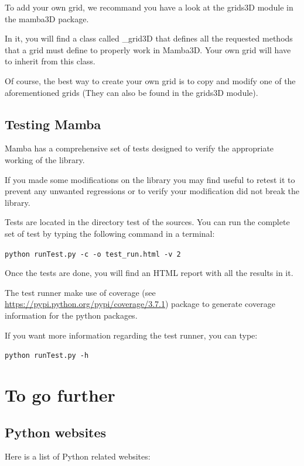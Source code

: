 \documentclass[a4paper,10pt,oneside]{article}
\begin{document}
To add your own grid, we recommand you have a look at the grids3D module in
the mamba3D package.

In it, you will find a class called \_grid3D that defines all the requested
methods that a grid must define to properly work in Mamba3D. Your own grid
will have to inherit from this class.

Of course, the best way to create your own grid is to copy and modify one
of the aforementioned grids (They can also be found in the grids3D module).

\subsection{Testing Mamba}
\label{cha:testing_mamba}

Mamba has a comprehensive set of tests designed to verify the appropriate
working of the library.

If you made some modifications on the library you may find useful to retest it
to prevent any unwanted regressions or to verify your modification did not break
the library.

Tests are located in the directory test of the sources. You can run the complete
set of test by typing the following command in a terminal:

\texttt{python runTest.py -c -o test\_run.html -v 2}

Once the tests are done, you will find an HTML report with all the results in it.

The test runner make use of coverage (see \url{https://pypi.python.org/pypi/coverage/3.7.1})
package to generate coverage information for the python packages.

If you want more information regarding the test runner, you can type:

\texttt{python runTest.py -h}

\pagebreak

\appendix

\section{To go further}
\label{cha:to_go_further}
\subsection{Python websites}

Here is a list of Python related websites:
\end{document}
